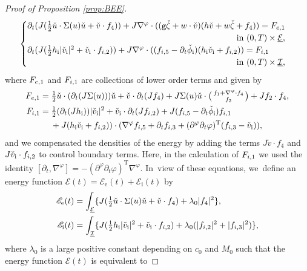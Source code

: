 \documentclass[11pt]{article}
\newcommand{\gr}{{\mathtt g}}
\newcommand{\dt}{\partial_t}
\newcommand{\cI}{{\mathcal I}}
\newcommand{\cE}{{\mathcal E}}
\newcommand{\ul}[1]{\underline{#1}}
\theoremstyle{definition}
\begin{document}
\begin{proof}[Proof of Proposition \ref{prop:BEE}]
\[\begin{cases}
\dt(J(\frac12\check{u}\cdot\Sigma(u)\check{u}+\check{v}\cdot f_4))
+ J\nabla^\varphi\cdot((\gr\check{\zeta}+w\cdot\check{v})(h\check{v}+w\check{\zeta}+f_4)) = F_{{\rm e},1} \\
\hfill \text{in } (0,T)\times\ul{\cE}, \\
\dt(J(\frac12h_\mathrm{i}|\check{v}_\mathrm{i}|^2 + \check{v}_\mathrm{i}\cdot f_{{\rm i},2}))
+ J\nabla^\varphi\cdot((f_{{\rm i},5}-\dt\check{\phi}_\mathrm{i})(h_\mathrm{i}\check{v}_\mathrm{i}+f_{{\rm i},2})) = F_{{\rm i},1} \\
\hfill \text{in } (0,T)\times\ul{\cI},
\end{cases}
\]
where $F_{{\rm e},1}$ and $F_{{\rm i},1}$ are collections of lower order terms and given by
\begin{align*}
F_{{\rm e},1}
&= \tfrac12\check{u}\cdot(\dt(J\Sigma(u)))\check{u} + \check{v}\cdot\dt(Jf_4)
+ J\Sigma(u)\check{u}\cdot\bigl(\begin{smallmatrix} f_1+\nabla^\varphi\cdot f_4 \\ f_2 \end{smallmatrix} \bigr) + Jf_2\cdot f_4, \\
F_{{\rm i},1}
&= \tfrac12(\dt(Jh_\mathrm{i}))|\check{v}_\mathrm{i}|^2 + \check{v}_\mathrm{i}\cdot\dt(Jf_{{\rm i},2})
+ J(f_{{\rm i},5}-\dt\check{\phi}_\mathrm{i})f_{{\rm i},1} \\
&\quad\;
+ J(h_\mathrm{i}\check{v}_\mathrm{i}+f_{{\rm i},2}))\cdot(\nabla^\varphi f_{{\rm i},5}+\dt f_{{\rm i},3}
+ (\partial^\varphi\dt\varphi)^\mathrm{T}(f_{{\rm i},3}-\check{v}_\mathrm{i})),
\end{align*}
and we compensated the densities of the energy by adding the terms $J\check{v}\cdot f_4$ and $J\check{v}_\mathrm{i}\cdot f_{{\rm i},2}$ to control boundary terms.
Here, in the calculation of $F_{{\rm i},1}$ we used the identity $[\dt,\nabla^\varphi]=-(\partial^\varphi\dt\varphi)^\mathrm{T}\nabla^\varphi$. In~view of these equations, we~define an energy function $\mathscr{E}(t)=\mathscr{E}_\mathrm{e}(t)+\mathscr{E}_\mathrm{i}(t)$ by
\begin{align*}
\mathscr{E}_\mathrm{e}(t)
&= \int_{\ul{\cE}}\{ J(\tfrac12\check{u}\cdot\Sigma(u)\check{u}+\check{v}\cdot f_4) + \lambda_0|f_4|^2 \}, \\
\mathscr{E}_\mathrm{i}(t)
&= \int_{\ul{\cI}}\{ J(\tfrac12h_\mathrm{i}|\check{v}_\mathrm{i}|^2 + \check{v}_\mathrm{i}\cdot f_{{\rm i},2}) + \lambda_0(|f_{{\rm i},2}|^2+|f_{{\rm i},3}|^2) \},
\end{align*}
where $\lambda_0$ is a large positive constant depending on $c_0$ and $M_0$ such that the energy function $\mathscr{E}(t)$ is equivalent to

\end{proof}
\end{document}
